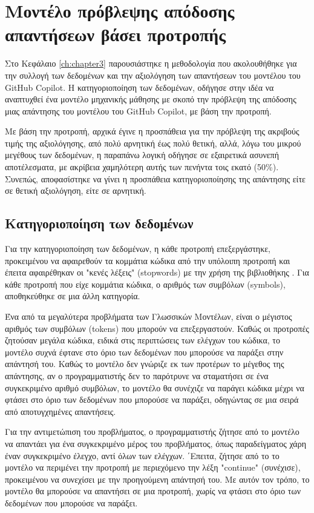 \chapter{Μοντέλο πρόβλεψης απόδοσης απαντήσεων βάσει προτροπής}
\label{ch:chapter4}

Στο Κεφάλαιο \ref{ch:chapter3} παρουσιάστηκε η μεθοδολογία που
ακολουθήθηκε για την συλλογή των δεδομένων και την αξιολόγηση των
απαντήσεων του μοντέλου του \textlatin{GitHub Copilot}. Η
κατηγοριοποίηση των δεδομένων, οδήγησε στην ιδέα να αναπτυχθεί ένα
μοντέλο μηχανικής μάθησης με σκοπό την πρόβλεψη της απόδοσης μιας
απάντησης του μοντέλου του \textlatin{GitHub Copilot}, με βάση την
προτροπή.

Με βάση την προτροπή, αρχικά έγινε η προσπάθεια για την πρόβλεψη της
ακριβούς τιμής της αξιολόγησης, από πολύ αρνητική έως πολύ θετική, αλλά,
λόγω του μικρού μεγέθους των δεδομένων, η παραπάνω λογική οδήγησε σε
εξαιρετικά ασυνεπή αποτέλεσματα, με ακρίβεια χαμηλότερη αυτής των
πενήντα τοις εκατό (50\%). Συνεπώς, αποφασίστηκε να γίνει η προσπάθεια
κατηγοριοποίησης της απάντησης είτε σε θετική αξιολόγηση, είτε σε
αρνητική.

\section{Κατηγοριοποίηση των δεδομένων}

Για την κατηγοριοποίηση των δεδομένων, η κάθε προτροπή επεξεργάστηκε,
προκειμένου να αφαιρεθούν τα κομμάτια κώδικα από την υπόλοιπη προτροπή
και έπειτα αφαιρέθηκαν οι "κενές λέξεις" (\textlatin{stopwords}) με την
χρήση της βιβλιοθήκης . Για
κάθε προτροπή που είχε κομμάτια κώδικα, ο αριθμός των συμβόλων
(\textlatin{symbols}), αποθηκεύθηκε σε μια άλλη κατηγορία.

Ένα από τα μεγαλύτερα προβλήματα των Γλωσσικών Μοντέλων, είναι ο
μέγιστος αριθμός των συμβόλων (\textlatin{tokens}) που μπορούν να
επεξεργαστούν. Καθώς οι προτροπές ζητούσαν μεγάλα κώδικα, ειδικά στις
περιπτώσεις των ελέγχων του κώδικα, το μοντέλο συχνά έφτανε στο όριο των
δεδομένων που μπορούσε να παράξει στην απάντησή του. Καθώς το μοντέλο
δεν γνώριζε εκ των προτέρων το μέγεθος της απάντησης, αν ο
προγραμματιστής δεν το παρότρυνε να σταματήσει σε ένα συγκεκριμένο
αριθμό συμβόλων, το μοντέλο θα συνέχιζε να παράγει κώδικα μέχρι να
φτάσει στο όριο των δεδομένων που μπορούσε να παράξει, οδηγώντας σε μια
σειρά από αποτυγχημένες απαντήσεις.

Για την αντιμετώπιση του προβλήματος, ο προγραμματιστής ζήτησε από το
μοντέλο να απαντάει για ένα συγκεκριμένο μέρος του προβλήματος, όπως
παραδείγματος χάρη έναν συγκεκριμένο έλεγχο, αντί όλων των ελέγχων.
΄Επειτα, ζήτησε από το το μοντέλο να περιμένει την προτροπή με
περιεχόμενο την λέξη "\textlatin{continue}" (συνέχισε), προκειμένου να
συνεχίσει με την προηγούμενη απάντησή του. Με αυτόν τον τρόπο, το
μοντέλο θα μπορούσε να απαντήσει σε μια προτροπή, χωρίς να φτάσει στο
όριο των δεδομένων που μπορούσε να παράξει.

